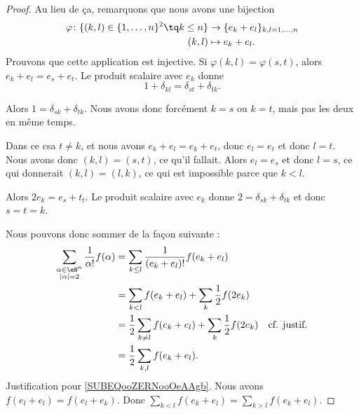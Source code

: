\begin{proof}
	Au lieu de ça, remarquons que nous avons une bijection
	\begin{equation}
		\begin{aligned}
			\varphi\colon \{ (k,l)\in \{ 1,\ldots,n \}^2\tq k\leq n \} & \to \{ e_k+e_l \}_{k,l=1,\ldots,n} \\
			(k,l)                                                      & \mapsto e_k+e_l.
		\end{aligned}
	\end{equation}
	Prouvons que cette application est injective. Si \( \varphi(k,l)=\varphi(s,t)\), alors \( e_k+e_l=e_s+e_t\). Le produit scalaire avec \( e_k\) donne
	\begin{equation}
		1+\delta_{kl}=\delta_{st}+\delta_{tk}.
	\end{equation}
	\begin{subproof}
		\spitem[Si \( k<l\)]
		Alors \( 1=\delta_{sk}+\delta_{tk}\). Nous avons donc forcément \( k=s\) ou \( k=t\), mais pas les deux en même temps.
		\begin{subproof}
			\spitem[Si \( s=k\)]
			Dans ce csa \( t\neq k\), et nous avons \( e_k+e_l=e_k+e_t\), donc \( e_l=e_t\) et donc \( l=t\). Nous avons donc \( (k,l)=(s,t)\), ce qu'il fallait.
			\spitem[Si \( t=k\)]
			Alors \( e_l=e_s\) et donc \( l=s\), ce qui donnerait \( (k,l)=(l,k)\), ce qui est impossible parce que \( k<l\).
		\end{subproof}
		\spitem[Si \( k=l\)]
		Alors \( 2e_k=e_s+t_t\). Le produit scalaire avec \( e_k\) donne \( 2=\delta_{sk}+\delta_{tk}\) et donc \( s=t=k\).
	\end{subproof}
	Nous pouvons donc sommer de la façon suivante :
	\begin{subequations}
		\begin{align}
			\sum_{\substack{ \alpha\in \eN^n                                                                                   \\ | \alpha |=2 }  }\frac{1}{ \alpha!}f(\alpha)&=\sum_{k\leq l}\frac{1}{ (e_k+e_l)!}f(e_k+e_l)\\
			 & =\sum_{k<l}f(e_k+e_l)+\sum_k\frac{1}{ 2}f(2e_k)                                                                 \\
			 & =\frac{1}{ 2}\sum_{k\neq l}f(e_k+e_l)+\sum_k\frac{1}{ 2}f(2e_k) & \text{cf. justif.}		\label{SUBEQooZERNooOeAAgb} \\
			 & =\frac{1}{ 2}\sum_{k,l}f(e_k+e_l).
		\end{align}
	\end{subequations}
	Justification pour \eqref{SUBEQooZERNooOeAAgb}. Nous avons \( f(e_l+e_l)=f(e_l+e_k)\). Donc \( \sum_{k<l} f(e_k+e_l)=\sum_{k>l}f(e_k+e_l)\).
\end{proof}

